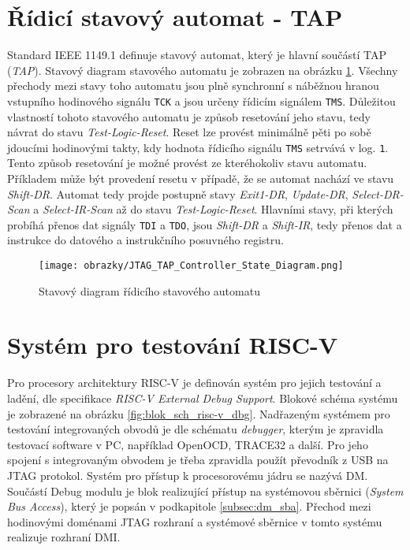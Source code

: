 \section{Řídicí stavový automat - \acs{TAP}}
Standard IEEE 1149.1 definuje stavový automat, který je hlavní součástí \acs{TAP} (\textit{\acl{TAP}}). Stavový diagram stavového automatu je zobrazen na obrázku \ref{fig:tap_controller}. Všechny přechody mezi stavy toho automatu jsou plně synchronní s náběžnou hranou vstupního hodinového signálu \texttt{\acs{TCK}} a jsou určeny řídicím signálem \texttt{\acs{TMS}}. Důležitou vlastností tohoto stavového automatu je způsob resetování jeho stavu, tedy návrat do stavu \textit{Test-Logic-Reset}. Reset lze provést minimálně pěti po sobě jdoucími hodinovými takty, kdy hodnota řídicího signálu \texttt{\acs{TMS}} setrvává v log. \texttt{1}. Tento způsob resetování je možné provést ze kteréhokoliv stavu automatu. Příkladem může být provedení resetu v případě, že se automat nachází ve stavu \textit{Shift-DR}. Automat tedy projde postupně stavy \textit{Exit1-DR}, \textit{Update-DR}, \textit{Select-DR-Scan} a \textit{Select-IR-Scan} až do stavu \textit{Test-Logic-Reset}. Hlavními stavy, při kterých probíhá přenos dat signály \texttt{\acs{TDI}} a \texttt{\acs{TDO}}, jsou \textit{Shift-DR} a \textit{Shift-IR}, tedy přenos dat a instrukce do datového a instrukčního posuvného registru. \cite {IEEE_1149-1}


\begin{figure}[H]
  \begin{center}
    \texttt{[image: obrazky/JTAG\_TAP\_Controller\_State\_Diagram.png]}
  \end{center}
  \caption{Stavový diagram řídicího stavového automatu \cite{JTAG_TAP_diagram}}
	\label{fig:tap_controller}
\end{figure}

\section{Systém pro testování \acs{RISC-V}}		\label{sec:risc-v_dbg}
Pro procesory architektury \acs{RISC-V} je definován systém pro jejich testování a ladění, dle specifikace \textit{RISC-V External Debug Support}. Blokové schéma systému je zobrazené na obrázku \ref{fig:blok_sch_risc-v_dbg}. Nadřazeným systémem pro testování integrovaných obvodů je dle schématu \textit{debugger}, kterým je zpravidla testovací software v PC, například OpenOCD, TRACE32 a další. Pro jeho spojení s integrovaným obvodem je třeba zpravidla použít převodník z USB na JTAG protokol. Systém pro přístup k procesorovému jádru se nazývá \ac{DM}. Součástí Debug modulu je blok realizující přístup na systémovou sběrnici (\textit{System Bus Access}), který je popsán v podkapitole \ref{subsec:dm_sba}. Přechod mezi hodinovými doménami \acs{JTAG} rozhraní a systémové sběrnice v tomto systému realizuje rozhraní \ac{DMI}. \cite{risc-v_dbg}

